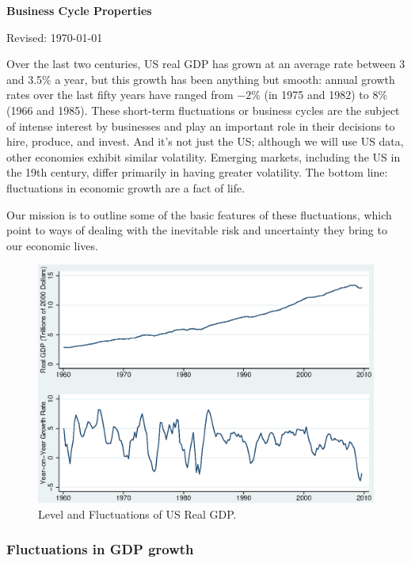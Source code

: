 \documentclass[letterpaper,12pt]{article}
\def\HeadName{Business Cycle Properties}
\begin{document}
\thispagestyle{empty}%
\Head

\centerline{\large \bf \HeadName}%
\centerline{Revised: \today}

\bigskip
Over the last two centuries, US real GDP has grown at an average
rate between 3 and 3.5\% a year, 
but this growth has been anything but smooth:  
annual growth rates over the last fifty years have
ranged from $-2$\% (in 1975 and 1982) to 8\% (1966 and 1985). 
These short-term fluctuations or business cycles 
are the subject of intense interest by businesses  
and play an important role in their decisions to hire, produce, and invest. 
And it's not just the US; 
although we will use US data, other economies exhibit similar
volatility.  
Emerging markets, including the US in the 19th century, 
differ primarily in having greater volatility.  
The bottom line:  fluctuations in economic growth 
are a fact of life.  

Our mission is to outline some of the basic features 
of these fluctuations, which point to ways of dealing with 
the inevitable risk and uncertainty they bring to our economic lives.  


\begin{figure}[h]
    \centering
    \includegraphics[scale=0.8]{usygy.eps}
    \caption{Level and Fluctuations of US Real GDP.}
    \label{fig:yandgy}
\end{figure}


\subsubsection*{Fluctuations in GDP growth}
\end{document}
